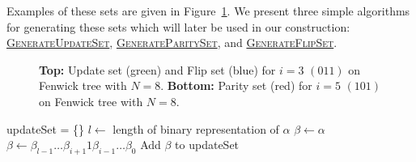 \documentclass[pdftex,pra,aps,twocolumn,twoside]{revtex4-2}
\theoremstyle{plain}
\theoremstyle{note}
\newcommand\+{{\footnotesize \raisebox{0.3ex}{+}}}
\begin{document}
Examples of these sets are given in Figure~\ref{fenwick_trees}. We present three simple algorithms for generating these sets which will later be used in our construction: \hyperref[GeonerateUpdateSet]{\textsc{GenerateUpdateSet}}, \hyperref[GenerateParitySet]{\textsc{GenerateParitySet}}, and \hyperref[GenerateFlipSet]{\textsc{GenerateFlipSet}}.
\begin{figure}[htbp]
\caption{\label{fenwick_trees} \textbf{Top:}  Update set (green) and Flip set (blue) for $i=3$ $(011)$ on Fenwick tree with $N=8$. \textbf{Bottom:} Parity set (red) for $i=5$ $(101)$ on Fenwick tree with $N=8$.}
\end{figure} \noindent

\begin{algorithm}[htbp]
\caption{\textsc{GenerateUpdateSet}\label{GenerateUpdateSet}}
\begin{algorithmic}[1]
\State updateSet = \{\}
\State $l \gets $ length of binary representation of $\alpha$
\State $\beta \gets \alpha$
        \State $\beta \gets \beta_{l-1}\ldots\beta_{i+1}1\beta_{i-1}\ldots\beta_0$
            \State Add $\beta$ to updateSet
        \EndIf
    \EndIf
\EndFor

\end{algorithmic}
\end{algorithm}
\end{document}
